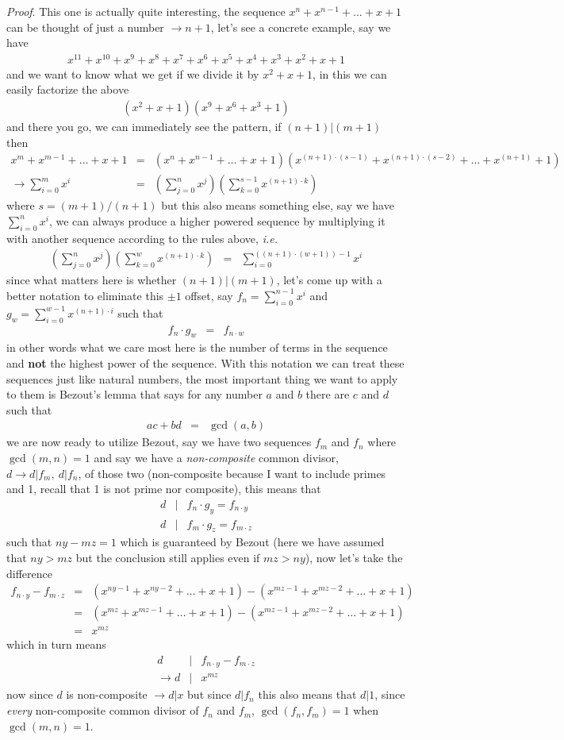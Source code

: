 \documentclass[aps,preprint,preprintnumbers,nofootinbib,showpacs,prd]{revtex4-1}
\newcommand{\ie}{{\it i.e.} }
\newcommand{\nbea}{\begin{eqnarray*}}
\newcommand{\neea}{\end{eqnarray*}}
\begin{document}
{\it Proof}. This one is actually quite interesting, the sequence $x^n + x^{n-1} + \ldots + x + 1$ can be thought of just a number $\to n+1$, let's see a concrete example, say we have
%
\nbea
x^{11} + x^{10}+x^9+x^8+x^7+x^6+x^5 + x^4 + x^3 + x^2 + x + 1
\neea
%
and we want to know what we get if we divide it by $x^2+x+1$, in this we can easily factorize the above
%
\nbea
(x^2 + x + 1)(x^9 + x^6 + x^3 + 1)
\neea
%
and there you go, we can immediately see the pattern, if $(n+1)|(m+1)$ then
%
\nbea
x^m + x^{m-1} + \ldots + x + 1 & = &(x^n + x^{n-1} + \ldots + x + 1) (x^{(n+1)\cdot(s - 1)} + x^{(n+1)\cdot(s - 2)} + \ldots + x^{(n+1)} + 1) \\
\to \sum_{i=0}^{m} x^i & = & \left ( \sum_{j=0}^{n} x^j \right ) \left ( \sum_{k=0}^{s-1} x^{(n+1)\cdot k} \right )
\neea
%
where $s = (m+1)/(n+1)$ but this also means something else, say we have $\sum_{i=0}^{n}x^i$, we can always produce a higher powered sequence by multiplying it with another sequence according to the rules above, \ie
%
\nbea
\left ( \sum_{j=0}^{n} x^j \right ) \left ( \sum_{k=0}^{w} x^{(n+1)\cdot k} \right ) & = & \sum_{i=0}^{((n+1)\cdot(w+1)) - 1} x^i
\neea
%
since what matters here is whether $(n+1)|(m+1)$, let's come up with a better notation to eliminate this $\pm1$ offset, say $f_{n} = \sum_{i=0}^{n-1}x^i$ and $g_{w} = \sum_{i=0}^{w-1} x^{(n+1)\cdot i}$ such that
%
\nbea
f_n \cdot g_w & = & f_{n\cdot w}
\neea
%
in other words what we care most here is the number of terms in the sequence and {\bf not} the highest power of the sequence. With this notation we can treat these sequences just like natural numbers, the most important thing we want to apply to them is Bezout's lemma that says for any number $a$ and $b$ there are $c$ and $d$ such that
%
\nbea
ac + bd & = & \gcd(a,b)
\neea
%
we are now ready to utilize Bezout, say we have two sequences $f_m$ and $f_n$ where $\gcd(m,n)=1$ and say we have a {\it non-composite} common divisor, $d \to d|f_m,~d|f_n$, of those two (non-composite because I want to include primes and 1, recall that 1 is not prime nor composite), this means that
%
\nbea
d &|& f_n\cdot g_y = f_{n\cdot y} \\
d &|& f_m\cdot g_z = f_{m\cdot z}
\neea
%
such that $ny - mz = 1$ which is guaranteed by Bezout (here we have assumed that $ny > mz$ but the conclusion still applies even if $mz > ny$), now let's take the difference
%
\nbea
f_{n\cdot y} - f_{m\cdot z} & = & (x^{ny-1} + x^{ny-2} + \ldots + x + 1) - (x^{mz-1} + x^{mz-2} + \ldots + x + 1) \\
& = & (x^{mz} + x^{mz-1} + \ldots + x + 1) - (x^{mz-1} + x^{mz-2} + \ldots + x + 1) \\
& = & x^{mz}
\neea
%
which in turn means
%
\nbea
d &|& f_{n\cdot y} - f_{m\cdot z} \\
\to d &|& x^{mz}
\neea
%
now since $d$ is non-composite $\to d|x$ but since $d|f_n$ this also means that $d|1$, since {\it every} non-composite common divisor of $f_n$ and $f_m$, $\gcd(f_n,f_m) = 1$ when $\gcd(m,n)=1$.
\end{document}
